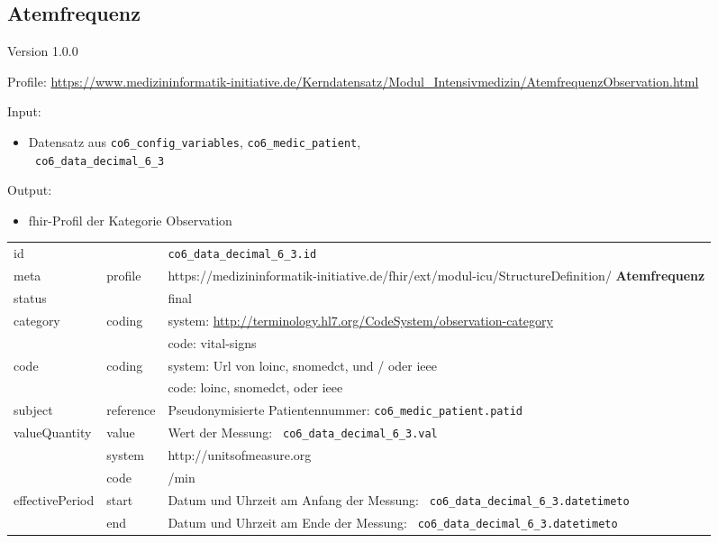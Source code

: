 \subsection{Atemfrequenz} 
\noindent Version 1.0.0

\noindent Profile: \url{https://www.medizininformatik-initiative.de/Kerndatensatz/Modul_Intensivmedizin/AtemfrequenzObservation.html}

\noindent Input:
\begin{itemize}
	\item Datensatz aus \texttt{co6\_config\_variables}, \texttt{co6\_medic\_patient}, \\ \texttt{
co6\_data\_decimal\_6\_3}
\end{itemize}
Output:
\begin{itemize}
        \item \ac{fhir}-Profil der Kategorie \glqq Observation\grqq{}
\end{itemize}
\begin{longtable}{|l|l|p{7.5cm}|}
        \hline
        \rowcolor{lightgray} \multicolumn{3}{|l|}{Data Mapping (inhaltlich)} \\ \hline
        id &  & \texttt{co6\_data\_decimal\_6\_3.id} \\ \hline
	meta & profile & https://medizininformatik-initiative.de/fhir/ext/modul-icu/StructureDefinition/\textbf{
Atemfrequenz} \\ \hline 
	status &  & final  \\ \hline 
	category & coding & system: \url{http://terminology.hl7.org/CodeSystem/observation-category} \\
\cline{3-3}
	& & code: vital-signs\\ \hline
	code & coding & system: Url von \ac{loinc}, \ac{snomedct}, und / oder \ac{ieee} \\ 
	\cline{3-3} 
	 &  & code: \ac{loinc}, \ac{snomedct}, oder \ac{ieee} \\ \hline
	subject & reference & Pseudonymisierte Patientennummer: \texttt{co6\_medic\_patient.patid} \\ \hline
	valueQuantity & value & Wert der Messung: \texttt{
co6\_data\_decimal\_6\_3.val} \\
        \cline{2-3}
         & system & http://unitsofmeasure.org \\
         \cline{2-3}
         & code & /min
\\ \hline
    effectivePeriod & start & Datum und Uhrzeit am Anfang der Messung: \texttt{
co6\_data\_decimal\_6\_3.datetimeto} \\
    \cline{2-3}
     & end & Datum und Uhrzeit am Ende der Messung: \texttt{
co6\_data\_decimal\_6\_3.datetimeto} \\ \hline
\end{longtable}


